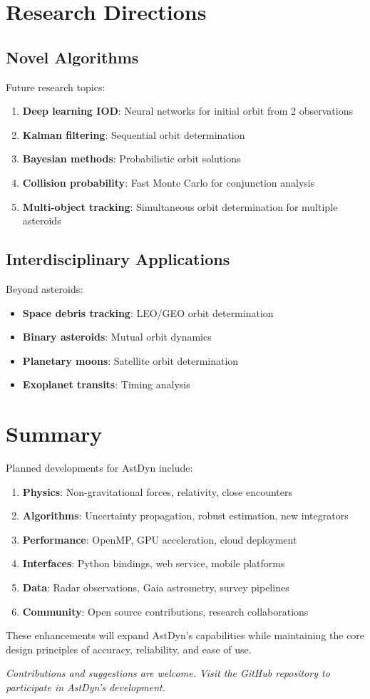 \section{Research Directions}

\subsection{Novel Algorithms}

Future research topics:
\begin{enumerate}
    \item \textbf{Deep learning IOD}: Neural networks for initial orbit from 2 observations
    \item \textbf{Kalman filtering}: Sequential orbit determination
    \item \textbf{Bayesian methods}: Probabilistic orbit solutions
    \item \textbf{Collision probability}: Fast Monte Carlo for conjunction analysis
    \item \textbf{Multi-object tracking}: Simultaneous orbit determination for multiple asteroids
\end{enumerate}

\subsection{Interdisciplinary Applications}

Beyond asteroids:
\begin{itemize}
    \item \textbf{Space debris tracking}: LEO/GEO orbit determination
    \item \textbf{Binary asteroids}: Mutual orbit dynamics
    \item \textbf{Planetary moons}: Satellite orbit determination
    \item \textbf{Exoplanet transits}: Timing analysis
\end{itemize}

\section{Summary}

Planned developments for AstDyn include:

\begin{enumerate}
    \item \textbf{Physics}: Non-gravitational forces, relativity, close encounters
    \item \textbf{Algorithms}: Uncertainty propagation, robust estimation, new integrators
    \item \textbf{Performance}: OpenMP, GPU acceleration, cloud deployment
    \item \textbf{Interfaces}: Python bindings, web service, mobile platforms
    \item \textbf{Data}: Radar observations, Gaia astrometry, survey pipelines
    \item \textbf{Community}: Open source contributions, research collaborations
\end{enumerate}

These enhancements will expand AstDyn's capabilities while maintaining the core design principles of accuracy, reliability, and ease of use.

\vspace{1cm}

\textit{Contributions and suggestions are welcome. Visit the GitHub repository to participate in AstDyn's development.}
